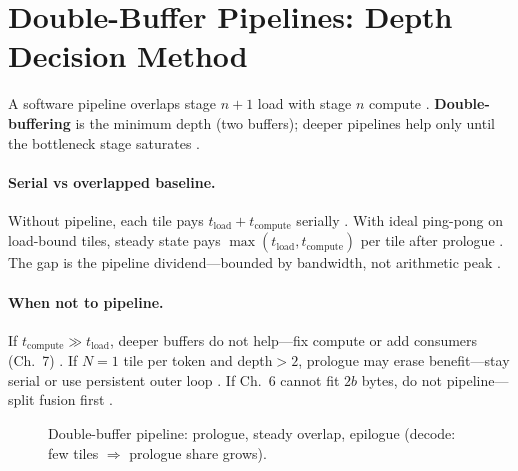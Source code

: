 
\section{Double-Buffer Pipelines: Depth Decision Method}
\label{sec:ch08_pipeline_theory}

A software pipeline overlaps stage $n{+}1$ load with stage $n$ compute \citep{dao2022flashattention,dlbook,semianalysis2024tma}.
\textbf{Double-buffering} is the minimum depth (two buffers); deeper pipelines help only until the bottleneck stage saturates \citep{shah2024flashattention3,memoryfloor2026}.

\paragraph{Serial vs overlapped baseline.}
Without pipeline, each tile pays $t_{\mathrm{load}} + t_{\mathrm{compute}}$ serially \citep{dlbook,patel2025llminference,semianalysis2024tma}.
With ideal ping-pong on load-bound tiles, steady state pays $\max(t_{\mathrm{load}}, t_{\mathrm{compute}})$ per tile after prologue \citep{shah2024flashattention3,dao2022flashattention}.
The gap is the pipeline dividend---bounded by bandwidth, not arithmetic peak \citep{memoryfloor2026,taxbreak2026,yirage2026}.

\paragraph{When not to pipeline.}
If $t_{\mathrm{compute}} \gg t_{\mathrm{load}}$, deeper buffers do not help---fix compute or add consumers (Ch.~7) \citep{shah2024flashattention3,patel2025llminference}.
If $N{=}1$ tile per token and depth$>2$, prologue may erase benefit---stay serial or use persistent outer loop \citep{mpk2025,nvidia2024cudagraphs,taxbreak2026}.
If Ch.~6 cannot fit $2b$ bytes, do not pipeline---split fusion first \citep{memoryfloor2026,yirage2026,chen2020compilerbasedhardw}.

\begin{figure}[t]
\centering
{}
\caption{Double-buffer pipeline: prologue, steady overlap, epilogue (decode: few tiles $\Rightarrow$ prologue share grows).}
\label{fig:pipeline_theory_pipeline}
\end{figure}

